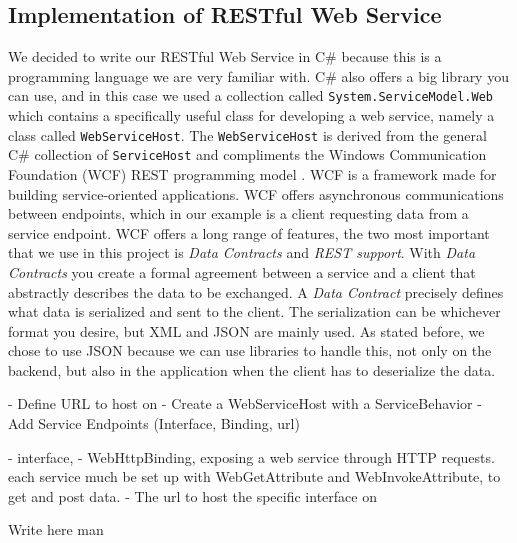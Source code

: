 \subsection{Implementation of RESTful Web Service}
\label{subsec:restImpl}

We decided to write our RESTful Web Service in C\# because this is a programming language we are very familiar with. C\# also offers a big library you can use, and in this case we used a collection called \texttt{System.ServiceModel.Web} which contains a specifically useful class for developing a web service, namely a class called \texttt{WebServiceHost}. The \texttt{WebServiceHost} is derived from the general C\# collection of \texttt{ServiceHost} and compliments the Windows Communication Foundation (WCF) REST programming model .
WCF is a framework made for building service-oriented applications. WCF offers asynchronous communications between endpoints, which in our example is a client requesting data from a service endpoint. WCF offers a long range of features, the two most important that we use in this project is \textit{Data Contracts} and \textit{REST support}. 
With \textit{Data Contracts} you create a formal agreement between a service and a client that abstractly describes the data to be exchanged. A \textit{Data Contract} precisely defines what data is serialized and sent to the client. The serialization can be whichever format you desire, but XML and JSON are mainly used. As stated before, we chose to use JSON because we can use libraries to handle this, not only on the backend, but also in the application when the client has to deserialize the data.



- Define URL to host on
- Create a WebServiceHost with a ServiceBehavior
- Add Service Endpoints (Interface, Binding, url)

- interface, 
- WebHttpBinding, exposing a web service through HTTP requests. each service much be set up with WebGetAttribute and WebInvokeAttribute, to get and post data.
- The url to host the specific interface on

Write here man